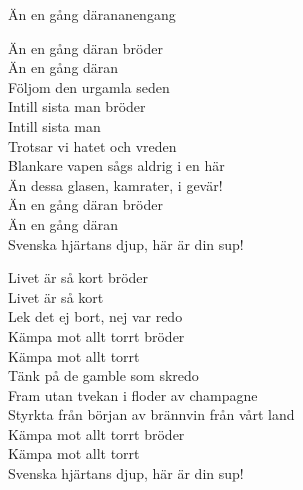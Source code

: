 \begin{song}{Än en gång däran}{anengang}
\begin{vers}
Än en gång däran bröder\\
Än en gång däran\\
Följom den urgamla seden\\
Intill sista man bröder\\
Intill sista man\\
Trotsar vi hatet och vreden\\
Blankare vapen sågs aldrig i en här\\
Än dessa glasen, kamrater, i gevär!\\
Än en gång däran bröder\\
Än en gång däran\\
Svenska hjärtans djup, här är din sup!\\
\end{vers}
\begin{vers}
Livet är så kort bröder\\
Livet är så kort\\
Lek det ej bort, nej var redo\\
Kämpa mot allt torrt bröder\\
Kämpa mot allt torrt\\
Tänk på de gamble som skredo\\
Fram utan tvekan i floder av champagne\\
Styrkta från början av brännvin från vårt land\\
Kämpa mot allt torrt bröder\\
Kämpa mot allt torrt\\
Svenska hjärtans djup, här är din sup!\\
\end{vers}
\end{song}
